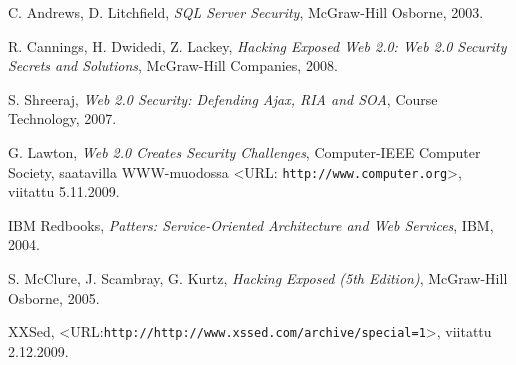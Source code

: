 \begin{thebibliography}{99}
C. Andrews, D. Litchfield, \textit{SQL Server Security}, McGraw-Hill Osborne, 2003.

R. Cannings, H. Dwidedi, Z. Lackey, \textit{Hacking Exposed Web 2.0: Web 2.0 Security Secrets and Solutions}, McGraw-Hill Companies, 2008.

S. Shreeraj, \textit{Web 2.0 Security: Defending Ajax, RIA and SOA}, Course Technology, 2007.

G. Lawton, \textit{Web 2.0 Creates Security Challenges}, Computer-IEEE Computer Society, saatavilla WWW-muodossa <URL: \texttt{http://www.computer.org}>,
viitattu 5.11.2009.

IBM Redbooks, \textit{Patters: Service-Oriented Architecture and Web Services}, IBM, 2004.

S. McClure, J. Scambray, G. Kurtz, \textit{Hacking Exposed (5th Edition)}, McGraw-Hill Osborne, 2005.

XXSed, <URL:\texttt{http://http://www.xssed.com/archive/special=1}>, viitattu 2.12.2009.

\end{thebibliography}
